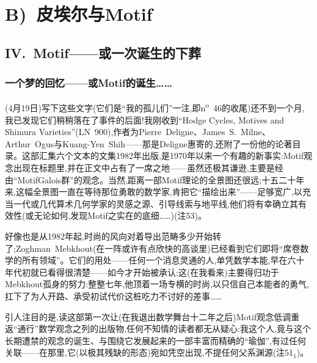 \providecommand{\fnoteplainmark}[3]{%
  \begingroup\renewcommand{\thefootnote}{#1}\footnotemark
  \renewcommand{\thefootnote}{#1#2}\footnotetext{#3}\endgroup
}
\chapter{B)~皮埃尔与Motif}

\section{IV.~Motif——或一次诞生的下葬}

\subsection{一个梦的回忆——或Motif的诞生……}


\pmark (4月19日)写下这些文字(它们是“我的孤儿们”一注,即n\textsuperscript{o}~46的收尾)还不到一个月,我已发现它们稍稍落在了事件的后面!我刚收到“Hodge Cycles, Motives and Shimura Varieties”(LN~900),作者为Pierre~Deligne、James~S.~Milne、Arthur~Ogus与Kuang-Yen~Shih——那是Deligne惠寄的,还附了一份他的论著目录。这部汇集六个文本的文集1982年出版,是1970年以来一个有趣的新事实:Motif观念出现在标题里,并在正文中占有了一席之地——虽然还极其谦逊,主要是经由“MotifGalois群”的观念。当然,距离一部Motif理论的全景图还很远;十五二十年来,这幅全景图一直在等待那位勇敢的数学家,肯把它“描绘出来”——足够宽广,以充当一代或几代算术几何学家的灵感之源、引导线索与地平线,他们将有幸确立其有效性(或无论如何,发现Motif之实在的底细……)(注53)。

好像也是从1982年起,时尚的风向对着导出范畴多少开始转了;Zoghman~Mebkhout(在一阵或许有点欣快的高谈里)已经看到它们即将“席卷数学的所有领域”。它们的用处——任何一个消息灵通的人,单凭数学本能,早在六十年代初就已看得很清楚——如今才开始被承认;这(在我看来)主要得归功于Mebkhout孤身的努力:整整七年,他顶着一场专横的时尚,以只信自己本能者的勇气,扛下了为人开路、承受初试代价这桩吃力不讨好的差事……

\pmark 引人注目的是,读这部第一次让(在我退出数学舞台十二年之后)Motif观念低调重返“通行”数学观念之列的出版物,任何不知情的读者都无从疑心:我这个人,竟与这个长期遭禁的观念的诞生、与围绕它发展起来的一部丰富而精确的“瑜伽”,有过任何关联——在那里,它(以极其残缺的形态)宛如凭空出现,不提任何父系渊源(注51$_{1}$)。


